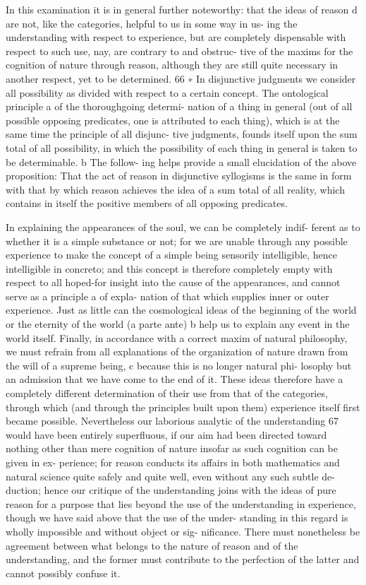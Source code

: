 In this examination it is in general further noteworthy: that the ideas
of reason d are not, like the categories, helpful to us in some way in us-
ing the understanding with respect to experience, but are completely
dispensable with respect to such use, nay, are contrary to and obstruc-
tive of the maxims for the cognition of nature through reason, although
they are still quite necessary in another respect, yet to be determined. 66
∗ In disjunctive judgments we consider all possibility as divided with respect to
a certain concept. The ontological principle a of the thoroughgoing determi-
nation of a thing in general (out of all possible opposing predicates, one is
attributed to each thing), which is at the same time the principle of all disjunc-
tive judgments, founds itself upon the sum total of all possibility, in which the
possibility of each thing in general is taken to be determinable. b The follow-
ing helps provide a small elucidation of the above proposition: That the act of
reason in disjunctive syllogisms is the same in form with that by which reason
achieves the idea of a sum total of all reality, which contains in itself the positive
members of all opposing predicates.

In explaining the appearances of the soul, we can be completely indif-
ferent as to whether it is a simple substance or not; for we are unable
through any possible experience to make the concept of a simple being
sensorily intelligible, hence intelligible in concreto; and this concept is
therefore completely empty with respect to all hoped-for insight into
the cause of the appearances, and cannot serve as a principle a of expla-
nation of that which supplies inner or outer experience. Just as little can
the cosmological ideas of the beginning of the world or the eternity of
the world (a parte ante) b help us to explain any event in the world itself.
Finally, in accordance with a correct maxim of natural philosophy, we
must refrain from all explanations of the organization of nature drawn
from the will of a supreme being, c because this is no longer natural phi-
losophy but an admission that we have come to the end of it. These
ideas therefore have a completely different determination of their use
from that of the categories, through which (and through the principles
built upon them) experience itself ﬁrst became possible. Nevertheless
our laborious analytic of the understanding 67 would have been entirely
superﬂuous, if our aim had been directed toward nothing other than
mere cognition of nature insofar as such cognition can be given in ex-
perience; for reason conducts its affairs in both mathematics and natural
science quite safely and quite well, even without any such subtle de-
duction; hence our critique of the understanding joins with the ideas of
pure reason for a purpose that lies beyond the use of the understanding
in experience, though we have said above that the use of the under-
standing in this regard is wholly impossible and without object or sig-
niﬁcance. There must nonetheless be agreement between what belongs
to the nature of reason and of the understanding, and the former must
contribute to the perfection of the latter and cannot possibly confuse
it.

